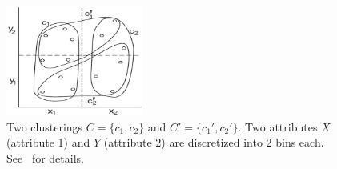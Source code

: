 \begin{figure}[tb]
\begin{center}
\includegraphics[width=0.4\textwidth]{fig/density_profile.eps}
\end{center}
\caption[An example of cluster density profiles]{\label{fig:density_profile} Two clusterings $C=\{c_1, c_2\}$ and $C'=\{c_1', c_2'\}$. Two attributes $X$ (attribute 1) and $Y$ (attribute 2) are discretized into 2 bins each. See~\cite{Bae2010} for details.}
\end{figure}



